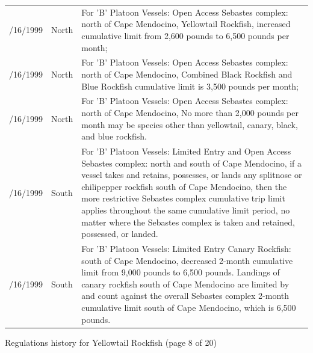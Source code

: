 \documentclass[12pt,]{article}
\begin{document}
\begin{tabular}{>{\centering}p{.60in}>{\centering}p{1.0in}>{\raggedright}p{4.20in}}
  4/16/1999 & 4030 North & For 'B' Platoon Vessels: Open Access Sebastes complex:  north of Cape Mendocino,  Yellowtail Rockfish, increased cumulative limit from 2,600 pounds to 6,500 pounds per month; \\ 
  4/16/1999 & 4030 North & For 'B' Platoon Vessels:  Open Access Sebastes complex: north of Cape Mendocino,  Combined Black Rockfish and Blue Rockfish cumulative limit is 3,500 pounds per month; \\ 
  4/16/1999 & 4030 North & For 'B' Platoon Vessels:  Open Access Sebastes complex: north of Cape Mendocino,  No more than 2,000 pounds per month may be species other than yellowtail, canary, black, and blue rockfish. \\ 
  4/16/1999 & 4030 South & For 'B' Platoon Vessels: Limited Entry and Open Access Sebastes complex: north and south of Cape Mendocino, if a vessel takes and retains, possesses, or lands any splitnose or chilipepper rockfish south of Cape Mendocino, then the more restrictive Sebastes complex cumulative trip limit applies throughout the same cumulative limit period, no matter where the Sebastes complex is taken and retained, possessed, or landed. \\ 
  4/16/1999 & 4030 South & For 'B' Platoon Vessels: Limited Entry Canary Rockfish: south of Cape Mendocino, decreased 2-month cumulative limit from 9,000 pounds to 6,500 pounds.  Landings of canary rockfish south of Cape Mendocino are limited by and count against the overall Sebastes complex 2-month cumulative limit south of Cape Mendocino, which is 6,500 pounds. \\ 
   \hline
\end{tabular}

\endgroup
\newpage
Regulations history for Yellowtail Rockfish (page 8 of 20)
\begingroup\fontsize{9pt}{10pt}\selectfont
\end{document}

